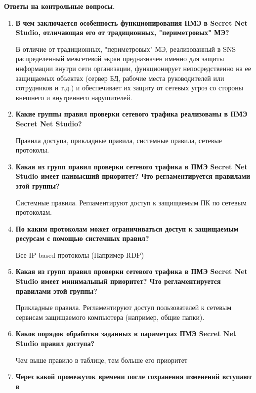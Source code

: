 \documentclass[a4paper,14pt]{extarticle}
\begin{document}
    \newpage
    \textbf{Ответы на контрольные вопросы.}
    \begin{enumerate}
        \singlespacing
        \item \textbf{В чем заключается особенность функционирования ПМЭ в Secret Net \linebreak Studio,
        отличающая его от традиционных, "периметровых" МЭ?}\par
        В отличие от традиционных, "периметровых" МЭ, реализованный в SNS \linebreak
        распределенный межсетевой экран предназначен именно для защиты \linebreak информации 
        внутри сети организации, функционирует непосредственно на ее защищаемых объектах 
        (сервер БД, рабочие места руководителей или сотрудников и т.д.) и обеспечивает 
        их защиту от сетевых угроз со стороны внешнего и внутреннего нарушителей.
        \item \textbf{Какие группы правил проверки сетевого трафика реализованы в ПМЭ Secret
        Net Studio?}\par
        Правила доступа, прикладные правила, системные правила, сетевые протоколы.
        \item \textbf{Какая из групп правил проверки сетевого трафика в ПМЭ Secret Net Studio
        имеет наивысший приоритет? Что регламентируется правилами этой \linebreak группы?}\par
        Системные правила. Регламентируют доступ к защищаемым ПК по сетевым протоколам.
        \item \textbf{По каким протоколам может ограничиваться доступ к защищаемым \linebreak ресурсам
        с помощью системных правил?}\par
        Все IP-based протоколы (Например RDP)
        \item \textbf{Какая из групп правил проверки сетевого трафика в ПМЭ Secret Net Studio
        имеет минимальный приоритет? Что регламентируется правилами этой
        группы?}\par
        Прикладные правила. Регламентируют доступ пользователей к сетевым сервисам защищаемого компьютера (например, общие папки).
        \item \textbf{Каков порядок обработки заданных в параметрах ПМЭ Secret Net Studio
        правил доступа?}\par
        Чем выше правило в таблице, тем больше его приоритет
        \item \textbf{Через какой промежуток времени после сохранения изменений вступают в
}
\end{enumerate}
\end{document}
